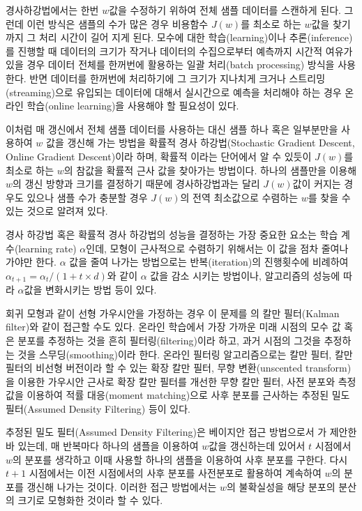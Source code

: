\documentclass[oneside,b5paper,11pt]{article} %
\begin{document}
 경사하강법에서는 한번 $w$값을 수정하기 위하여 전체 샘플 데이터를 스캔하게 된다. 그런데 이런 방식은 샘플의 수가 많은 경우 
비용함수 $J(w)$를 최소로 하는 $w$값을 찾기 까지 그 처리 시간이 길어 지게 된다. 모수에 대한 학습(learning)이나 추론(inference)를 진행할 때 데이터의 크기가 작거나 데이터의 수집으로부터 예측까지 시간적 여유가 있을 경우 데이터 전체를 한꺼번에 활용하는 일괄 처리(batch processing) 방식을 사용한다. 반면 데이터를 한꺼번에 처리하기에 그 크기가 지나치게 크거나 스트리밍(streaming)으로 유입되는 데이터에 대해서 실시간으로 예측을 처리해야 하는 경우 온라인 학습(online learning)을 사용해야 할 필요성이 있다.

 이처럼 매 갱신에서 전체 샘플 데이터를 사용하는 대신 샘플 하나 혹은 일부분만을 사용하여 $w$ 값을 갱신해 가는 방법을 확률적 경사 하강법(Stochastic Gradient Descent, Online Gradient Descent)이라 하며, 확률적 이라는 단어에서 알 수 있듯이 $J(w)$를 최소로 하는 $w$의 참값을 확률적 근사 값을 찾아가는 방법이다. 하나의 샘플만을 이용해 $w$의 갱신 방향과 크기를 결정하기 때문에 경사하강법과는 달리 $J(w)$값이 커지는 경우도 있으나 샘플 수가 충분할 경우 $J(w)$의 전역 최소값으로 수렴하는 $w$를 찾을 수 있는 것으로 알려져 있다. \citep{Bottou2010}

 경사 하강법 혹은 확률적 경사 하강법의 성능을 결정하는 가장 중요한 요소는 학습 계수(learning rate) $\alpha$인데, 모형이 근사적으로 수렴하기 위해서는 이 값을 점차 줄여나가야만 한다. $\alpha$ 값을 줄여 나가는 방법으로는 반복(iteration)의 진행횟수에 비례하여 $\alpha_{t+1} = \alpha_{t} / (1 + t \times d )$와 같이 $\alpha$ 값을 감소 시키는 방법이나, 알고리즘의 성능에 따라 $\alpha$값을 변화시키는 방법 등이 있다. 

 회귀 모형과 같이 선형 가우시안을 가정하는 경우 이 문제를 \citet{Kalman1960}의 칼만 필터(Kalman filter)와 같이 접근할 수도 있다. 온라인 학습에서 가장 가까운 미래 시점의 모수 값 혹은 분포를 추정하는 것을 흔히 필터링(filtering)이라 하고, 과거 시점의 그것을 추정하는 것을 스무딩(smoothing)이라 한다. 온라인 필터링 알고리즘으로는 칼만 필터\citep{Kalman1960}, 칼만 필터의 비선형 버전이라 할 수 있는 확장 칼만 필터\citep{Smith1962}, 무향 변환(unscented transform)을 이용한 가우시안 근사로 확장 칼만 필터를 개선한 무향 칼만 필터\citep{Julier1997}, 사전 분포와 측정값을 이용하여 적률 대응(moment matching)으로 사후 분포를 근사하는 추정된 밀도 필터(Assumed Density Filtering)\citep{Opper1996} 등이 있다.
 
 추정된 밀도 필터(Assumed Density Filtering)은 베이지안 접근 방법으로서 \citet{Opper1996}가 제안한바 있는데, 매 반복마다 하나의 샘플을 이용하여 $w$값을 갱신하는데 있어서 $t$ 시점에서 $w$의 분포를 생각하고 이때 사용할 하나의 샘플을 이용하여 사후 분포를 구한다. 다시 $t+1$ 시점에서는 이전 시점에서의 사후 분포를 사전분포로 활용하여 계속하여 $w$의 분포를 갱신해 나가는 것이다. 이러한 접근 방법에서는 $w$의 불확실성을 해당 분포의 분산의 크기로 모형화한 것이라 할 수 있다. 
\end{document}
